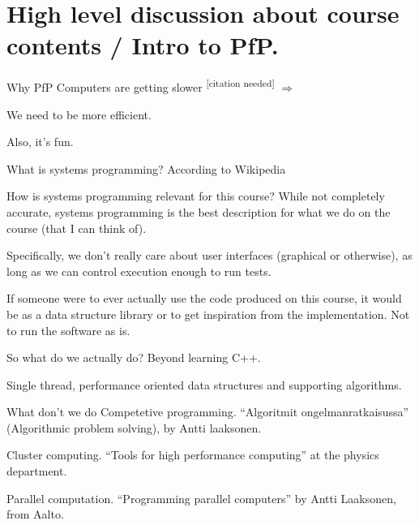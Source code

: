 \documentclass[11pt, aspectratio=169, table]{beamer}
\begin{document}
\section{High level discussion about course contents / Intro to PfP.}
\begin{frame}{Why PfP}
\setlength\parskip{\fill}
\pause
Computers are getting slower \textsuperscript{[citation needed]} $\Rightarrow$

We need to be more \alert{efficient}.

Also, it's fun.
\end{frame}

\begin{frame}{What is systems programming?}
\setlength\parskip{\fill}
\pause
According to Wikipedia

\end{frame}

\begin{frame}{How is systems programming relevant for this course?}
\setlength\parskip{\fill}
\pause
While not completely accurate, systems programming is the best description for what we do on the course (that I can think of).

\pause
Specifically, we don't really care about user interfaces (graphical or otherwise), as long as we can control execution enough to 
run tests.

If someone were to ever actually use the code produced on this course, it would be as a data structure library or to get inspiration from
the implementation. Not to run the software as is.
\end{frame}

\begin{frame}{So what do we actually do?}
\setlength\parskip{\fill}
Beyond learning C++.\pause

Single thread, performance oriented data structures and supporting algorithms.
\end{frame}

\begin{frame}{What don't we do}
\setlength\parskip{\fill}\pause
Competetive programming. ``Algoritmit ongelmanratkaisussa'' (Algorithmic problem solving), by Antti laaksonen.

Cluster computing. ``Tools for high performance computing'' at the physics department.

Parallel computation. ``Programming parallel computers'' by Antti Laaksonen, from Aalto.
\end{frame}
\end{document}

